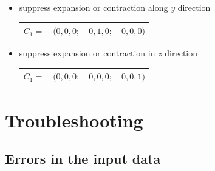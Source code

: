 \documentclass[final,12pt,makeidx,DIV=calc]{article}
\begin{document}
{{{{{{\begin{itemize}
\begin{center}
\begin{tabular}{|cccc|}
\hline
$C_1=($&$1,0,0;$&$ 0,0,0 ;$&$ 0,0,0)$\\
\hline
\end{tabular}
\end{center}
%
\item suppress expansion or contraction along $y$ direction
\begin{center}
\begin{tabular}{|cccc|}
\hline
$C_1=$&$(0,0,0;$&$ 0,1,0 ;$&$ 0,0,0)$\\
\hline
\end{tabular}
\end{center}
%
\item suppress expansion or contraction in $z$ direction
\begin{center}
\begin{tabular}{|cccc|}
\hline
$C_1=$&$(0,0,0;$&$ 0,0,0 ;$&$ 0,0,1)$\\
\hline
\end{tabular}
\end{center}
%
\end{itemize}


\newpage
\section{Troubleshooting}

\subsection{Errors in the input data}

}}}}}}
\end{document}
